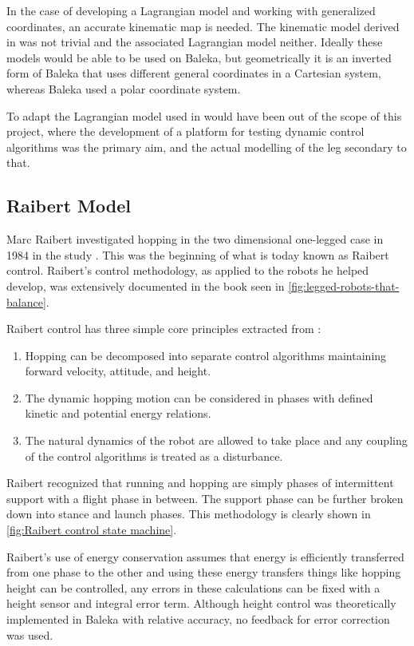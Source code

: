 In the case of developing a Lagrangian model and working with generalized coordinates, an accurate kinematic map is needed. The kinematic model derived in \cite{Yu2006} was not trivial and the associated Lagrangian model neither. Ideally these models would be able to be used on Baleka, but geometrically it is an inverted form of Baleka that uses different general coordinates in a Cartesian system, whereas Baleka used a polar coordinate system. 

To adapt the Lagrangian model used in \cite{Yu2006} would have been out of the scope of this project, where the development of a platform for testing dynamic control algorithms was the primary aim, and the actual modelling of the leg secondary to that.

\subsection{Raibert Model}

Marc Raibert investigated hopping in the two dimensional one-legged case in 1984 in the study \cite{Raibert1984}. This was the beginning of what is today known as Raibert control. Raibert's control methodology, as applied to the robots he helped develop, was extensively documented in the book seen in \cref{fig:legged-robots-that-balance}.

Raibert control has three simple core principles extracted from \cite{Raibert1984}:
\begin{enumerate}
\item Hopping can be decomposed into separate control algorithms maintaining forward velocity, attitude, and height.
\item The dynamic hopping motion can be considered in phases with defined kinetic and potential energy relations.
\item The natural dynamics of the robot are allowed to take place and any coupling of the control algorithms is treated as a disturbance.
\end{enumerate}

Raibert recognized that running and hopping are simply phases of intermittent support with a flight phase in between. The support phase can be further broken down into stance and launch phases. This methodology is clearly shown in \cref{fig:Raibert control state machine}.

Raibert's use of energy conservation assumes that energy is efficiently transferred from one phase to the other and using these energy transfers things like hopping height can be controlled, any errors in these calculations can be fixed with a height sensor and integral error term. Although height control was theoretically implemented in Baleka with relative accuracy, no feedback for error correction was used. 

